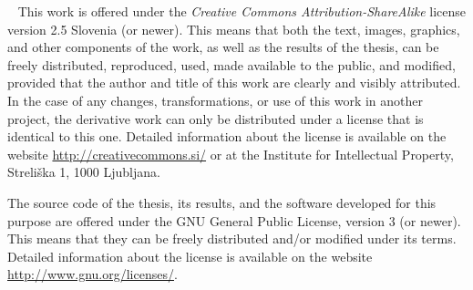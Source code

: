 \licensepage
{
    ~\vfill\noindent
    This work is offered under the \emph{Creative Commons Attribution-ShareAlike} license version 2.5 Slovenia (or newer). This means that both the text, images, graphics, and other components of the work, as well as the results of the thesis, can be freely distributed, reproduced, used, made available to the public, and modified, provided that the author and title of this work are clearly and visibly attributed. In the case of any changes, transformations, or use of this work in another project, the derivative work can only be distributed under a license that is identical to this one. Detailed information about the license is available on the website \url{http://creativecommons.si/} or at the Institute for Intellectual Property, Streliška 1, 1000 Ljubljana.
    
    \begin{center}
        \Huge\ccbysa
    \end{center}
    
     \medskip\noindent   
    The source code of the thesis, its results, and the software developed for this purpose are offered under the GNU General Public License, version 3 (or newer). This means that they can be freely distributed and/or modified under its terms. Detailed information about the license is available on the website \url{http://www.gnu.org/licenses/}.
}